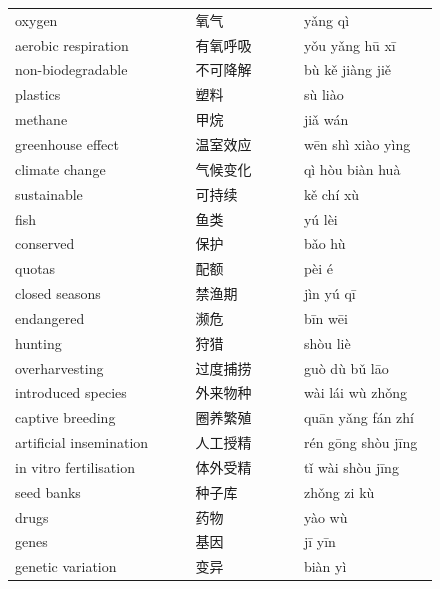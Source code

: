 \documentclass[11pt]{article}
\begin{document}
\begin{longtable}{@{}p{0.40\linewidth}p{0.24\linewidth}p{0.30\linewidth}@{}}
oxygen & 氧气 & yǎng qì \\
aerobic respiration & 有氧呼吸 & yǒu yǎng hū xī \\
non-biodegradable & 不可降解 & bù kě jiàng jiě \\
plastics & 塑料 & sù liào \\
methane & 甲烷 & jiǎ wán \\
greenhouse effect & 温室效应 & wēn shì xiào yìng \\
climate change & 气候变化 & qì hòu biàn huà \\
sustainable & 可持续 & kě chí xù \\
fish & 鱼类 & yú lèi \\
conserved & 保护 & bǎo hù \\
quotas & 配额 & pèi é \\
closed seasons & 禁渔期 & jìn yú qī \\
endangered & 濒危 & bīn wēi \\
hunting & 狩猎 & shòu liè \\
overharvesting & 过度捕捞 & guò dù bǔ lāo \\
introduced species & 外来物种 & wài lái wù zhǒng \\
captive breeding & 圈养繁殖 & quān yǎng fán zhí \\
artificial insemination & 人工授精 & rén gōng shòu jīng \\
in vitro fertilisation & 体外受精 & tǐ wài shòu jīng \\
seed banks & 种子库 & zhǒng zi kù \\
drugs & 药物 & yào wù \\
genes & 基因 & jī yīn \\
genetic variation & 变异 & biàn yì \\
\end{longtable}
\end{document}
